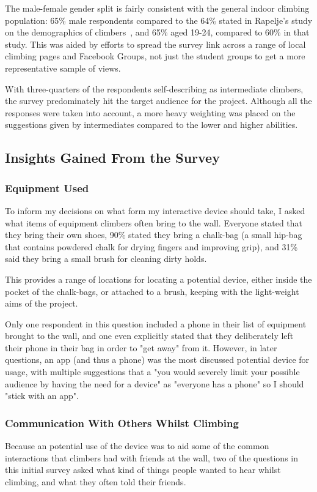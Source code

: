 The male-female gender split is fairly consistent with the general indoor climbing population: 65\% male respondents compared to the 64\% stated in Rapelje's study on the demographics of climbers~\cite{climbing-sub-worlds}, and 65\% aged 19-24, compared to 60\% in that study.
This was aided by efforts to spread the survey link across a range of local climbing pages and Facebook Groups, not just the student groups to get a more representative sample of views.

With three-quarters of the respondents self-describing as intermediate climbers, the survey predominately hit the target audience for the project. 
Although all the responses were taken into account, a more heavy weighting was placed on the suggestions given by intermediates compared to the lower and higher abilities.



\subsection{Insights Gained From the Survey}
\subsubsection{Equipment Used}
To inform my decisions on what form my interactive device should take, I asked what items of equipment climbers often bring to the wall.
Everyone stated that they bring their own shoes, 90\% stated they bring a chalk-bag (a small hip-bag that contains powdered chalk for drying fingers and improving grip), and 31\% said they bring a small brush for cleaning dirty holds.

This provides a range of locations for locating a potential device, either inside the pocket of the chalk-bags, or attached to a brush, keeping with the light-weight aims of the project.

Only one respondent in this question included a phone in their list of equipment brought to the wall, and one even explicitly stated that they deliberately left their phone in their bag in order to "get away" from it. 
However, in later questions, an app (and thus a phone) was the most discussed potential device for usage, with multiple suggestions that a "you would severely limit your possible audience by having the need for a device" as "everyone has a phone" so I should "stick with an app".



\subsubsection{Communication With Others Whilst Climbing}
Because an potential use of the device was to aid some of the common interactions that climbers had with friends at the wall, two of the questions in this initial survey asked what kind of things people wanted to hear whilst climbing, and what they often told their friends.

